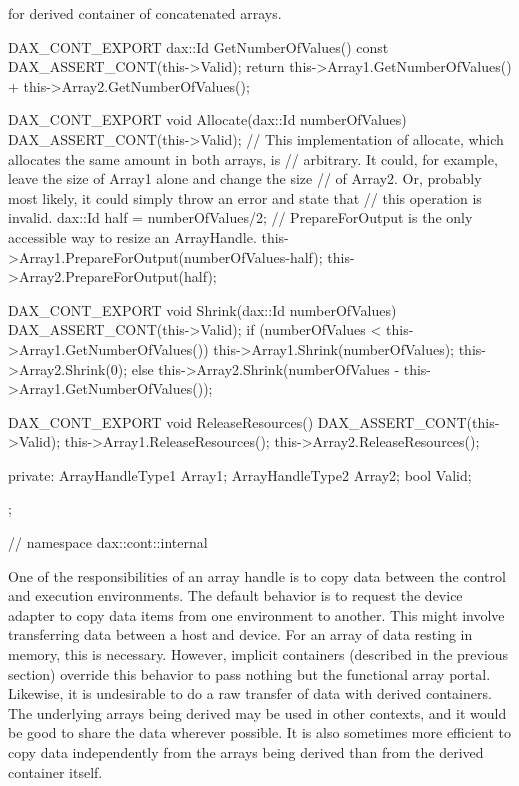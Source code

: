 \begin{daxexample}[ex:DerivedArrayContainer]{ for derived container of concatenated arrays.}
{{{{  DAX_CONT_EXPORT
  dax::Id GetNumberOfValues() const {
    DAX_ASSERT_CONT(this->Valid);
    return this->Array1.GetNumberOfValues() + this->Array2.GetNumberOfValues();
  }

  DAX_CONT_EXPORT
  void Allocate(dax::Id numberOfValues) {
    DAX_ASSERT_CONT(this->Valid);
    // This implementation of allocate, which allocates the same amount in both arrays, is
    // arbitrary. It could, for example, leave the size of Array1 alone and change the size
    // of Array2. Or, probably most likely, it could simply throw an error and state that
    // this operation is invalid.
    dax::Id half = numberOfValues/2;
    // PrepareForOutput is the only accessible way to resize an ArrayHandle.
    this->Array1.PrepareForOutput(numberOfValues-half);
    this->Array2.PrepareForOutput(half);
  }

  DAX_CONT_EXPORT
  void Shrink(dax::Id numberOfValues) {
    DAX_ASSERT_CONT(this->Valid);
    if (numberOfValues < this->Array1.GetNumberOfValues())
      {
      this->Array1.Shrink(numberOfValues);
      this->Array2.Shrink(0);
      }
    else
      {
      this->Array2.Shrink(numberOfValues - this->Array1.GetNumberOfValues());
      }
  }

  DAX_CONT_EXPORT
  void ReleaseResources() {
    DAX_ASSERT_CONT(this->Valid);
    this->Array1.ReleaseResources();
    this->Array2.ReleaseResources();
  }

private:
  ArrayHandleType1 Array1;
  ArrayHandleType2 Array2;
  bool Valid;
};

}
}
} // namespace dax::cont::internal
\end{daxexample}

One of the responsibilities of an array handle is to copy data between the
control and execution environments. The default behavior is to request the
device adapter to copy data items from one environment to another. This
might involve transferring data between a host and device. For an array of
data resting in memory, this is necessary. However, implicit containers
(described in the previous section) override this behavior to pass nothing
but the functional array portal. Likewise, it is undesirable to do a raw
transfer of data with derived containers. The underlying arrays being
derived may be used in other contexts, and it would be good to share the
data wherever possible. It is also sometimes more efficient to copy data
independently from the arrays being derived than from the derived container
itself.


